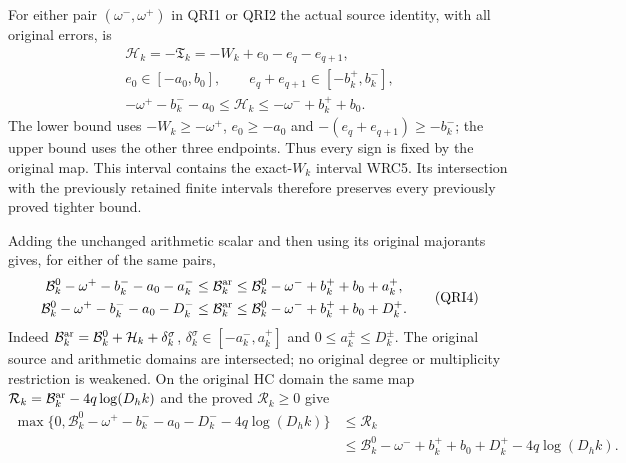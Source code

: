 \documentclass[11pt,a4paper]{article}
\begin{document}
For either pair $(\omega^-,\omega^+)$ in QRI1 or QRI2 the actual
source identity, with all original errors, is
\[
\begin{gathered}
 \mathcal H_k=-\mathfrak T_k=-W_k+e_0-e_q-e_{q+1},\\
 e_0\in[-a_0,b_0],\qquad
 e_q+e_{q+1}\in[-b_k^+,b_k^-],\\
 -\omega^+-b_k^--a_0\le\mathcal H_k
                            \le-\omega^-+b_k^++b_0.
\end{gathered}\tag{QRI3}
\]
The lower bound uses $-W_k\ge-\omega^+$, $e_0\ge-a_0$ and
$-(e_q+e_{q+1})\ge-b_k^-$; the upper bound uses the other three
endpoints. Thus every sign is fixed by the original map. This
interval contains the exact-$W_k$ interval WRC5. Its intersection
with the previously retained finite intervals therefore preserves
every previously proved tighter bound.

Adding the unchanged arithmetic scalar and then using its original
majorants gives, for either of the same pairs,
\[
\begin{split}
 \mathcal B_k^0-\omega^+-b_k^--a_0-a_k^-
 &\le\mathcal B_k^{\rm ar}
 \le\mathcal B_k^0-\omega^-+b_k^++b_0+a_k^+,\\
 \mathcal B_k^0-\omega^+-b_k^--a_0-D_k^-
 &\le\mathcal B_k^{\rm ar}
 \le\mathcal B_k^0-\omega^-+b_k^++b_0+D_k^+.
\end{split}\tag{QRI4}
\]
Indeed $\mathcal B_k^{\rm ar}=\mathcal B_k^0+\mathcal H_k
+\delta_k^\sigma$, $\delta_k^\sigma\in[-a_k^-,a_k^+]$ and
$0\le a_k^\pm\le D_k^\pm$. The original source and arithmetic
domains are intersected; no original degree or multiplicity
restriction is weakened. On the original HC domain the same map
$\mathcal R_k=\mathcal B_k^{\rm ar}-4q\log(D_hk)$ and the
proved $\mathcal R_k\ge0$ give
\[
\begin{split}
 \max\{0,\mathcal B_k^0-\omega^+-b_k^--a_0-D_k^-
                              -4q\log(D_hk)\}
 &\le\mathcal R_k\\
 &\le\mathcal B_k^0-\omega^-+b_k^++b_0+D_k^+
                              -4q\log(D_hk).
\end{split}\tag{QRI5}
\]
\end{document}
